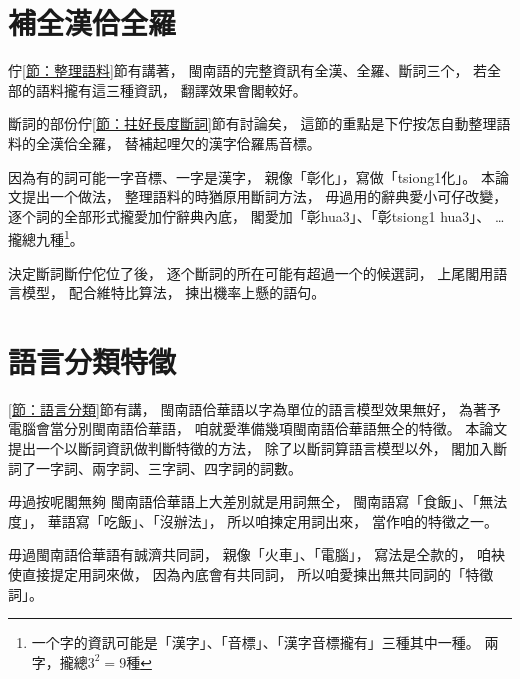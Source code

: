 
\section{補全漢佮全羅}
\label{節：補全漢佮全羅}
佇\ref{節：整理語料}節有講著，
閩南語的完整資訊有全漢、全羅、斷詞三个，
若全部的語料攏有這三種資訊，
翻譯效果會閣較好。

斷詞的部份佇\ref{節：拄好長度斷詞}節有討論矣，
這節的重點是下佇按怎自動整理語料的全漢佮全羅，
替補起哩欠的漢字佮羅馬音標。

因為有的詞可能一字音標、一字是漢字，
親像「彰化」，寫做「tsiong1化」。
本論文提出一个做法，
整理語料的時猶原用斷詞方法，
毋過用的辭典愛小可仔改變，
逐个詞的全部形式攏愛加佇辭典內底，
閣愛加「彰hua3」、「彰tsiong1 hua3」、
…攏總九種\footnote{一个字的資訊可能是「漢字」、「音標」、「漢字音標攏有」三種其中一種。
兩字，攏總$3^{2}=9$種}。


決定斷詞斷佇佗位了後，
逐个斷詞的所在可能有超過一个的候選詞，
上尾閣用語言模型，
配合維特比算法，
揀出機率上懸的語句。


\section{語言分類特徵}
\label{節：語言分類特徵}

\ref{節：語言分類}節有講，
閩南語佮華語以字為單位的語言模型效果無好，
為著予電腦會當分別閩南語佮華語，
咱就愛準備幾項閩南語佮華語無仝的特徵。
本論文提出一个以斷詞資訊做判斷特徵的方法，
除了以斷詞算語言模型以外，
閣加入斷詞了一字詞、兩字詞、三字詞、四字詞的詞數。

毋過按呢閣無夠
閩南語佮華語上大差別就是用詞無仝，
閩南語寫「食飯」、「無法度」，
華語寫「吃飯」、「沒辦法」，
所以咱揀定用詞出來，
當作咱的特徵之一。

毋過閩南語佮華語有誠濟共同詞，
親像「火車」、「電腦」，
寫法是仝款的，
咱袂使直接提定用詞來做，
因為內底會有共同詞，
所以咱愛揀出無共同詞的「特徵詞」。


